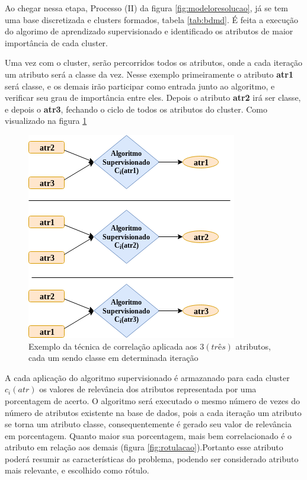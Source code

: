 Ao chegar nessa etapa, Processo (II) da figura \ref{fig:modeloresolucao}, já se tem uma base discretizada e clusters formados, tabela \ref{tab:bdmd}. É feita a execução do algorimo de aprendizado supervisionado e identificado os atributos de maior importância de cada cluster.

Uma vez com o cluster, serão percorridos todos os atributos, onde a cada iteração um atributo será a classe da vez. Nesse exemplo primeiramente o atributo \textbf{atr1} será classe, e os demais irão participar como entrada junto ao algoritmo, e verificar seu grau de importância entre eles. Depois o atributo \textbf{atr2} irá ser classe, e depois o \textbf{atr3}, fechando o ciclo de todos os atributos do cluster. Como visualizado na figura \ref{fig:tecnicamodelocomp} 
\begin{figure}[h!]
        \centering
        \includegraphics[scale=0.7]{figs/tecnicamodeloComp.png}
        \caption{Exemplo da técnica de correlação aplicada aos ${3 (três)}$ atributos, cada um sendo classe em determinada iteração } \label{fig:tecnicamodelocomp}
\end{figure}

A cada aplicação do algoritmo supervisionado é armazanado para cada cluster ${c_i(atr)}$  os valores de relevância dos atributos representada por uma porcentagem de acerto. O algoritmo será executado o mesmo número de vezes do número de atributos existente na base de dados, pois a cada iteração um atributo se torna um atributo classe, consequentemente é gerado seu valor de relevância em porcentagem. Quanto maior sua porcentagem, mais bem correlacionado é o atributo em relação aos demais (figura \ref{fig:rotulacao}).Portanto esse atributo poderá resumir as características do problema, podendo ser considerado atributo mais relevante, e escolhido como rótulo.

